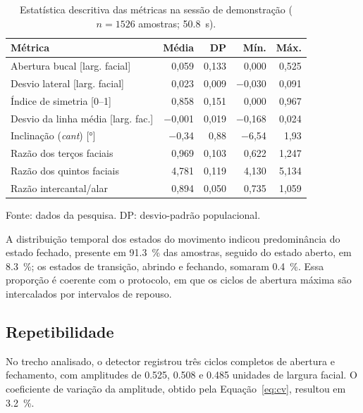 \documentclass[
    article,
    11pt,
    oneside,
    a4paper,
    english,
    brazil
]{abntex2}
\begin{document}
\begin{table}[htb]
    \centering
    \caption{Estatística descritiva das métricas na sessão de demonstração
    ($n = \num{1526}$ amostras; \SI{50,8}{\second}).}
    \label{tab:metricas}
    \begin{tabular}{lrrrr}
        \toprule
        \textbf{Métrica} & \textbf{Média} & \textbf{DP} &
        \textbf{Mín.} & \textbf{Máx.} \\
        \midrule
        Abertura bucal [larg. facial]     & 0,059 & 0,133 & 0,000 & 0,525 \\
        Desvio lateral [larg. facial]     & 0,023 & 0,009 & $-$0,030 & 0,091 \\
        Índice de simetria [0--1]         & 0,858 & 0,151 & 0,000 & 0,967 \\
        Desvio da linha média [larg. fac.]& $-$0,001 & 0,019 & $-$0,168 & 0,024 \\
        Inclinação (\textit{cant}) [\si{\degree}] & $-$0,34 & 0,88 & $-$6,54 & 1,93 \\
        Razão dos terços faciais          & 0,969 & 0,103 & 0,622 & 1,247 \\
        Razão dos quintos faciais         & 4,781 & 0,119 & 4,130 & 5,134 \\
        Razão intercantal/alar            & 0,894 & 0,050 & 0,735 & 1,059 \\
        \bottomrule
    \end{tabular}
    \par\vspace{0.3cm}
    \footnotesize
    Fonte: dados da pesquisa. DP: desvio-padrão populacional.
\end{table}

A distribuição temporal dos estados do movimento indicou predominância do
estado fechado, presente em \SI{91,3}{\percent} das amostras, seguido do
estado aberto, em \SI{8,3}{\percent}; os estados de transição, abrindo e
fechando, somaram \SI{0,4}{\percent}. Essa proporção é coerente com o
protocolo, em que os ciclos de abertura máxima são intercalados por
intervalos de repouso.

\subsection{Repetibilidade}

No trecho analisado, o detector registrou três ciclos completos de abertura
e fechamento, com amplitudes de \num{0,525}, \num{0,508} e \num{0,485}
unidades de largura facial. O coeficiente de variação da amplitude, obtido
pela Equação~\eqref{eq:cv}, resultou em \SI{3,2}{\percent}.
\end{document}
